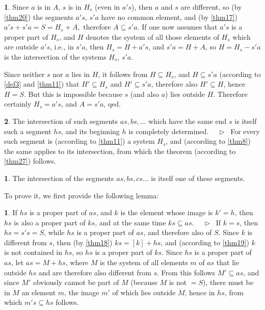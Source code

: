 \documentclass[leqno,hidelinks]{article}
\theoremstyle{definition}
\newtheorem{satz}{\protect\satzname}
\newtheorem*{zusatz}{\protect\zusatzname}
\newtheorem*{hilfssatz}{\protect\hilfssatzname}
\newcommand{\satzname}{}
\newcommand{\zusatzname}{}
\newcommand{\hilfssatzname}{}
\renewcommand{\satzname}{\hspace{-4pt}.\ Satz}%
\renewcommand{\zusatzname}{Zusatz}%
\renewcommand{\hilfssatzname}{Hilfssatz}%
\renewcommand{\satzname}{\hspace{-4pt}.\ Theorem}%
\renewcommand{\zusatzname}{Corollary}%
\renewcommand{\hilfssatzname}{Lemma}%
\newcommand\Beweis{\medskip \newline $ \phantom{'.'} \rhd \ $}%
\newcommand{\partof}{\subseteq}
\newcommand{\sref}[1]{\underline{\ref{#1}}}%
\begin{document}
\begin{paracol}{2}
\begin{satz}
Since $a$ is in $A$, $s$ is in $H_s$ (even in $a's$), then $a$ and $s$ are
different, so (by \sref{thm20}) the segments $a's$, $s'a$ have no common element,
and (by \sref{thm17}) $a's+  s'a=S=H_s+ A,$ therefore $A \partof s'a$.
If one now assumes that $a's$ is a proper part of $H_s$, and $H$ denotes the
system of all those elements of $H_s$ which are outside $a's$, i.e., in $s'a$,
then $H_s = H+a's$, and $s'a = H + A$, so $H=H_s-s'a$ is the intersection of the
systems $H_s$, $s'a$.

Since neither $s$ nor $a$ lies in $H$, it follows from $H \partof H_s$, and
$H \partof s'a$ (according to \sref{def3} and \sref{thm11}) that $H' \partof H_s$
and $H' \partof s'a$, therefore also $H' \partof H$, hence $H = S$. But this is
impossible because $s$ (and also $a$) lies outside $H$. Therefore certainly
$H_s = a's$, and $A = s'a$, qed.
\end{satz}

\newpage

\begin{satz}\label{thm28}
The intersection of such segments $as, bs, \ldots$ which have the same end $s$ is
itself such a segment $hs$, and its beginning $h$ is completely determined.
\Beweis
For every such segment is (according to \sref{thm11}) a system $H_s$, and (according
to \sref{thm8}) the same applies to its intersection, from which the theorem
(according to \sref{thm27}) follows.
\end{satz}

\begin{zusatz} \label{cor_to_thm28}
The intersection of the segments $as, bs, cs \ldots$ is itself one of
these segments.
\end{zusatz}

To prove it, we first provide the following lemma:

\begin{hilfssatz}
If $hs$ is a proper part of $as$, and $k$ is the element whose image is $k'=h$,
then $hs$ is also a proper part of $ks$, and at the same time $ks \partof as$.
\Beweis
If $k=s$, then $hs=s's= S$, while $hs$ is a proper part of $as$, and therefore
also of $S$. Since $k$ is different from $s$, then (by \sref{thm18}) $ks = [k]+ hs$,
and (according to \sref{thm19}) $k$ is not contained in $hs$, so $hs$ is a proper
part of $ks$. Since $hs$ is a proper part of $as$, let $as = M + hs$, where $M$
is the system of all elements $m$ of $as$ that lie outside $hs$ and are therefore
also different from $s$. From this follows $M' \partof as$, and since $M'$ obviously
cannot be part of $M$ (because $M$ is not $= S$), there must be in $M$ an element
$m$, the image $m'$ of which lies outside $M$, hence in $hs$, from which
$m's \partof hs$ follows.
\end{hilfssatz}


\end{paracol}
\end{document}
